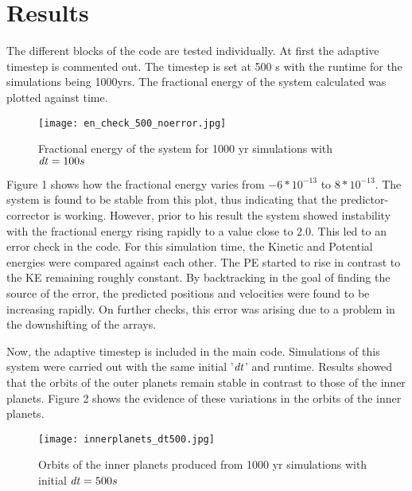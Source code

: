\documentclass[11pt]{article}
\begin{document}
\medskip
\section{Results}
\medskip

{\normalsize{

The different blocks of the code are tested individually. At first the adaptive timestep is commented out. The timestep is set at 500 s with the runtime for the simulations being 1000yrs. The fractional energy of the system calculated was plotted against time.  
\medskip 

\begin{figure} [t]
\texttt{[image: en\_check\_500\_noerror.jpg]}
\centering
\caption{Fractional energy of the system for 1000 yr simulations with ${\it dt} = 100 s$}
\centering
\end{figure}

Figure 1 shows how the fractional energy varies from $-6*10^{-13}$ to $8*10^{-13}$. The system is found to be stable from this plot, thus indicating that the predictor-corrector is working. However, prior to his result the system showed instability with the fractional energy rising rapidly to a value close to 2.0. This led to an error check in the code. For this simulation time, the Kinetic and Potential energies were compared against each other. The PE started to rise in contrast to the KE remaining roughly constant. By backtracking in the goal of finding the source of the error, the predicted positions and velocities were found to be increasing rapidly. On further checks, this error was arising due to a problem in the downshifting of the arrays. 
\medskip

Now, the adaptive timestep is included in the main code. Simulations of this system were carried out with the same initial '$\it dt$' and runtime. Results showed that the orbits of the outer planets remain stable in contrast to those of the inner planets. Figure 2 shows the evidence of these variations in the orbits of the inner planets.

\begin{figure} [h]
\texttt{[image: innerplanets\_dt500.jpg]}
\centering
\caption{Orbits of the inner planets produced from 1000 yr simulations with initial ${\it dt}= 500 s$}
\centering
\end{figure}

}}
\end{document}

